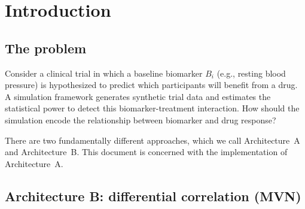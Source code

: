 \documentclass[11pt]{article}
\begin{document}
\maketitle
\thispagestyle{fancy}

\begin{abstract}
This document traces four attempts to implement direct mean
moderation (Architecture~A) for the biomarker-treatment
interaction in the \texttt{pmsimstats-ng} clinical trial
simulation framework. Three attempts produced incorrect
behavior due to scaling errors: one generated no signal during
off-drug periods, another generated signal that decayed too
rapidly, and a third generated signal so large that power
reached 1.00 under all conditions. The correct formulation
uses standardized biomarker values, a binary on-drug
indicator, and scaling by the biological response standard
deviation to produce effect sizes that are calibrated against
the existing multivariate normal (MVN) architecture. We
present the mathematical derivation, explain why each
incorrect attempt failed, and provide empirical verification.
The narrative is intended to illustrate how dimensional
analysis and calibration against a known reference
implementation can guide the development of simulation
components.
\end{abstract}

\tableofcontents

\section{Introduction}

\subsection{The problem}

Consider a clinical trial in which a baseline biomarker
$B_i$ (e.g., resting blood pressure) is hypothesized to
predict which participants will benefit from a drug. A
simulation framework generates synthetic trial data and
estimates the statistical power to detect this
biomarker-treatment interaction. How should the simulation
encode the relationship between biomarker and drug response?

There are two fundamentally different approaches, which we
call Architecture~A and Architecture~B. This document is
concerned with the implementation of Architecture~A.

\subsection{Architecture B: differential correlation (MVN)}
\end{document}
